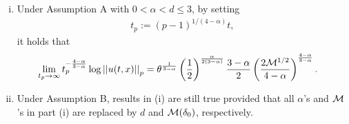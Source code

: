 \documentclass[9pt,table,xcolor=dvipsnames]{beamer}%
\begin{document}
\begin{frame}[fragile] %
  \begin{theorem}
    \begin{enumerate}[(i)]
    \item Under \textcolor{assumption_color}{Assumption A} with $0<\alpha<d\le 3$, by setting
     \begin{align*}
      t_p := (p-1)^{1/(4-\alpha)}t,
     \end{align*}
     it holds that
     \begin{align*}
      \lim_{t_p\to \infty}t_p^{-\frac{4-\alpha}{3-\alpha}}\log \left|\left| u(t,x) \right|\right|_p
      &= \theta^{\frac{1}{3-\alpha}}
	     \left(\frac{1}{2}\right)^{\frac{\alpha}{2(3-\alpha)}}
	 \frac{3-\alpha}{2}
	 \left(\frac{2\mathcal{M}^{1/2}}{4-\alpha}\right)^{\frac{4-\alpha}{3-\alpha}}.
     \end{align*}
	\vspace{1em}
    \item Under \textcolor{assumption_color}{Assumption B}, results in (i) are still true provided that all $\alpha$'s and $\mathcal{M}$'s in part (i) are replaced by $d$ and $\mathcal{M}(\delta_0)$, respectively.
    \end{enumerate}
 \end{theorem}
\end{frame}
\end{document}
